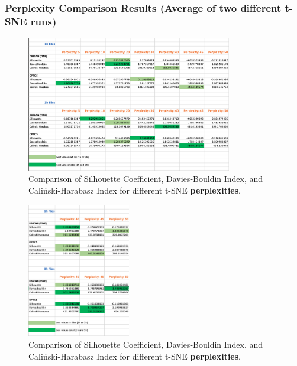 \subsubsection{Perplexity Comparison Results (Average of two different t-SNE runs)}
\label{appendix:compareAveragePerplexity}

\begin{figure}[H]
  \centering
  \includegraphics[width=0.8\textwidth]{./images/tsneParametersTest/perplexity/perplexityEvaluationScoresAverage.png}
  \caption{Comparison of Silhouette Coefficient, Davies-Bouldin Index, and Caliński-Harabasz Index for different t-SNE \textbf{perplexities}.}
  \label{figure:perplexityEvaluationScoresAverage}
\end{figure}

\begin{figure}[H]
  \centering
  \includegraphics[width=0.4\textwidth]{./images/tsneParametersTest/perplexity/perplexityEvaluationScoresDetailedAverage.png}
  \caption{Comparison of Silhouette Coefficient, Davies-Bouldin Index, and Caliński-Harabasz Index for different t-SNE \textbf{perplexities}.}
  \label{figure:perplexityEvaluationScoresDetailedAverage}
\end{figure}


\clearpage